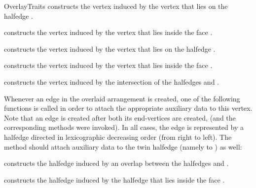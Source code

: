\begin{ccRefConcept}{OverlayTraits}
    {constructs the vertex  induced by the vertex  that lies on
     the halfedge .}

    {constructs the vertex  induced by the vertex  that lies
     inside the face .}

    {constructs the vertex  induced by the vertex  that lies on
     the halfedge .}

    {constructs the vertex  induced by the vertex  that lies
     inside the face .}

    {constructs the vertex  induced by the intersection of the
    halfedges  and .}

Whenever an edge in the overlaid arrangement is created, one of the
following functions is called in order to attach the appropriate
auxiliary data to this vertex. Note that an edge is created after both
its end-vertices are created, (and the corresponding 
methods were invoked). In all cases, the edge is represented by a halfedge
 directed in lexicographic decreasing order (from right to left). The
 method should attach auxiliary data to the twin halfedge
(namely to ) as well:

    {constructs the halfedge  induced by an overlap between the
    halfedges  and .}

    {constructs the halfedge  induced by the halfedge  that lies
     inside the face .}


\end{ccRefConcept}
